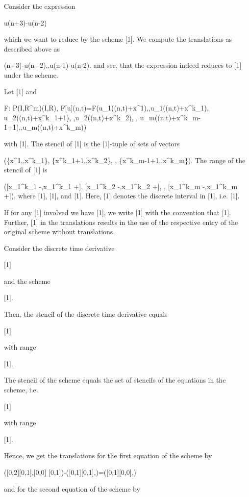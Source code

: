 \documentclass{article}
\begin{document}
{	Consider the expression
	
		u(n+3)-u(n-2)
	
	which we want to reduce by the scheme [1]. We compute the translations as described above as
	
		(n+3)-u(n+2),,u(n-1)-u(n-2).
	and see, that the expression indeed reduces to [1] under the scheme.


	Let [1] and
	
		F:
		{P}({I},{R}^m)({I},{R}),
		F[u](n,t)=F(u_1((n,t)+x^1),,u_1((n,t)+x^{k_1}),
		u_2((n,t)+x^{k_1+1}),
		,u_2((n,t)+x^{k_2}),
		,
		u_m((n,t)+x^{k_{m-1}+1}),,u_m((n,t)+x^{k_m}))
	
	
	with [1].
	The {stencil} of [1] is the [1]-tuple of sets of vectors
	
		(\{x^1,,x^{k_1}\},
		\{x^{k_1+1},,x^{k_2}\},
		,
		\{x^{k_{m-1}+1},,x^{k_m}\}).
	The {range} of the stencil of [1] is
	
		([x_1^{k_1 -},x_1^{k_1 +}]\cdots[x_{d+1}^{k_1 -},x_{d+1}^{k_1 +}],
		[x_1^{k_2 -},x_1^{k_2 +}]\cdots[x_{d+1}^{k_2 -},x_{d+1}^{k_2 +}],
			,
		[x_1^{k_m -},x_1^{k_m +}]\cdots[x_{d+1}^{k_m -},x_{d+1}^{k_m +}]
		),
	where [1], [1],
	and [1]. Here, [1] denotes the discrete interval in [1], i.e. [1].

If for any [1] involved we have [1], we write [1] with the convention that [1].  Further, [1] in the translations results in the use of the respective entry of the original scheme without translations.

	Consider the discrete time derivative
	
	[1]
	
	and the scheme
	
	[1].
	
	Then, the stencil of the discrete time derivative equals
	
	[1]
	
	with range
	
	[1].
	
	The stencil of the scheme equals the set of stencils of the equations in the scheme, i.e.
	
	[1]
	
	with range
	
	[1].
	
	Hence, we get the translations for the first equation of the scheme by
	
	
		([0,2][0,1],[0,0] [0,1])-([0,1][0,1],\Big)=([0,1][0,0],\Big)
	
	
	and for the second equation of the scheme by
	
}
\end{document}

